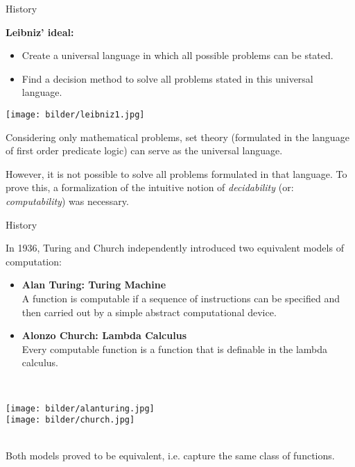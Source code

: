 \documentclass[xcolor=dvipsnames]{beamer}
\begin{document}
\begin{frame}{History}

\parbox{8cm}{{\bf Leibniz' ideal:}
\begin{itemize}
\item Create a universal language in which all possible problems can be stated. 
\item Find  a decision method to solve all problems stated in this universal language.
\end{itemize}} 
\parbox{2.5cm}{\texttt{[image: bilder/leibniz1.jpg]}}

Considering only mathematical problems, set theory (formulated in the language of  
first order predicate logic) can serve as the universal language. 

However, it is not possible to solve all problems formulated in that language. 
To prove this, a formalization of the intuitive notion of {\em decidability} 
(or: {\em computability}) was necessary. 
\end{frame}

\begin{frame}{History}

In 1936, Turing and Church independently introduced two equivalent models of computation: \\ 
\parbox{7cm}{
\begin{itemize} 
\item {\bf Alan Turing: Turing Machine}\\ 
{\small A function is computable if a sequence of instructions can be specified and then carried out by 
a simple abstract computational device.}\\[2ex]
\item {\bf Alonzo Church: Lambda Calculus}\\ 
{\small Every computable function is a function that is definable in the lambda calculus.}
\end{itemize}}
\parbox{1cm}{\ }
\parbox{2cm}{
\texttt{[image: bilder/alanturing.jpg]}\\[1ex] \texttt{[image: bilder/church.jpg]}}\\[1ex]
Both models proved to be equivalent, i.e. capture the same class of functions.
\end{frame}
\end{document}
